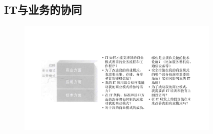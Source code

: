 \subsection{IT与业务的协同}
\begin{figure}[H]
	\centering
	\vspace{-0.5em}
	\includegraphics[width=0.85\textwidth]{img/IT与业务的协同.pdf}
	\vspace{-0.5em}
\end{figure}
	